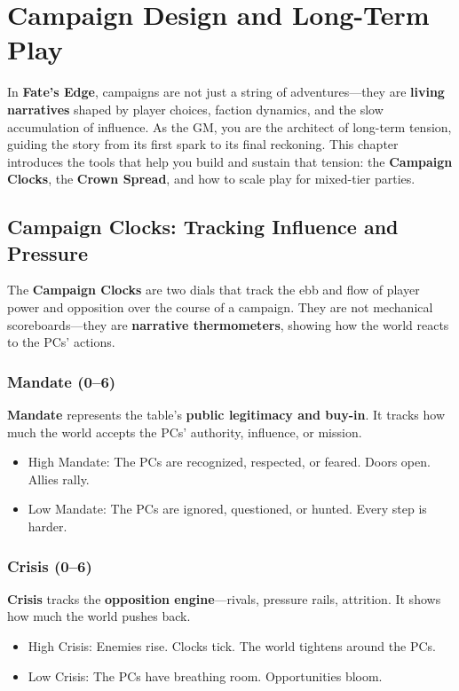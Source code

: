 \chapter{Campaign Design and Long-Term Play}

In \textbf{Fate's Edge}, campaigns are not just a string of adventures—they are \textbf{living narratives} shaped by player choices, faction dynamics, and the slow accumulation of influence. As the GM, you are the architect of long-term tension, guiding the story from its first spark to its final reckoning. This chapter introduces the tools that help you build and sustain that tension: the \textbf{Campaign Clocks}, the \textbf{Crown Spread}, and how to scale play for mixed-tier parties.

\section*{Campaign Clocks: Tracking Influence and Pressure}

The \textbf{Campaign Clocks} are two dials that track the ebb and flow of player power and opposition over the course of a campaign. They are not mechanical scoreboards—they are \textbf{narrative thermometers}, showing how the world reacts to the PCs' actions.

\subsection*{Mandate (0–6)}

\textbf{Mandate} represents the table's \textbf{public legitimacy and buy-in}. It tracks how much the world accepts the PCs' authority, influence, or mission.

\begin{itemize}
    \item High Mandate: The PCs are recognized, respected, or feared. Doors open. Allies rally.
    \item Low Mandate: The PCs are ignored, questioned, or hunted. Every step is harder.
\end{itemize}

\subsection*{Crisis (0–6)}

\textbf{Crisis} tracks the \textbf{opposition engine}—rivals, pressure rails, attrition. It shows how much the world pushes back.

\begin{itemize}
    \item High Crisis: Enemies rise. Clocks tick. The world tightens around the PCs.
    \item Low Crisis: The PCs have breathing room. Opportunities bloom.
\end{itemize}

